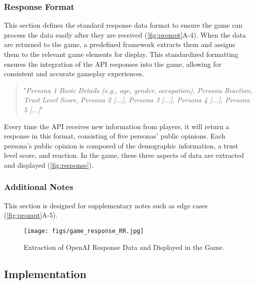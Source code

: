 \subsubsection{Response Format}
This section defines the standard response data format to ensure the game can process the data easily after they are received (\autoref{fig:prompt}A-4). When the data are returned to the game, a predefined framework extracts them and assigns them to the relevant game elements for display. This standardized formatting ensures the integration of the API responses into the game, allowing for consistent and accurate gameplay experiences.
\begin{quote}
    "\textit{Persona 1 Basic Details (e.g., age, gender, occupation), Persona Reaction, Trust Level Score, Persona 2 [...], Persona 3 [...], Persona 4 [...], Persona 5 [...]}"
\end{quote}
Every time the API receives new information from players, it will return a response in this format, consisting of five personas' public opinions. Each persona's public opinion is composed of the demographic information, a trust level score, and reaction. In the game, these three aspects of data are extracted and displayed (\autoref{fig:response}).

\subsubsection{Additional Notes}
This section is designed for supplementary notes such as edge cases (\autoref{fig:prompt}A-5).
\begin{figure}[H]
    \centering
    \texttt{[image: figs/game\_response\_RR.jpg]}
    \caption{Extraction of OpenAI Response Data and Displayed in the Game.}
    \label{fig:response}
\end{figure}

\subsection{Implementation}
